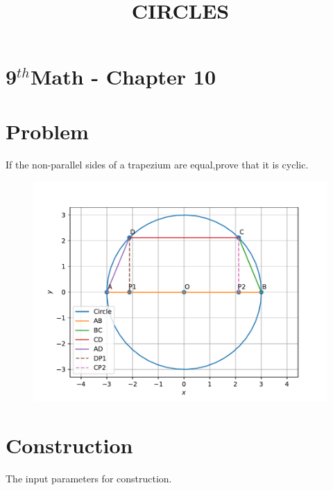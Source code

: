 \documentclass[10pt]{article}
\begin{document}
\begin{center}
\title{\textbf{CIRCLES}}
\date{\vspace{-5ex}}
\maketitle
\end{center}
\section*{9$^{th}$Math - Chapter 10}
\section*{Problem}
If the  non-parallel sides of a trapezium are equal,prove that it is cyclic.
\begin{figure}[!h]
	\begin{center}
	\includegraphics[width=\columnwidth]{./figs/fig.pdf}
	\end{center}
\caption{}
\label{fig:1}
\end{figure}
\section*{Construction}
The input parameters for construction.\\
\end{document}
